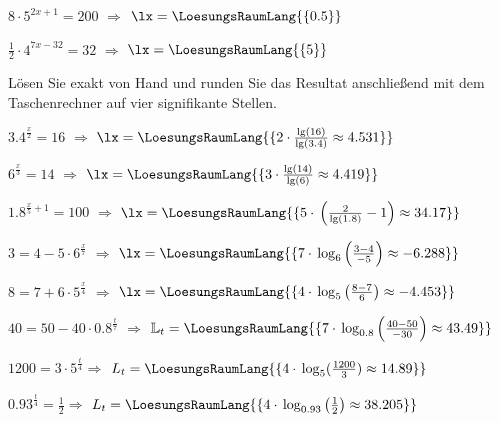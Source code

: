 \begin{bbwAufgabenBlock}
\item $8\cdot{} 5^{2x+1} = 200$  $\Longrightarrow$ $\lx=\LoesungsRaumLang{\{ 0.5 \}}$ 


\item $\frac12 \cdot{} 4^{7x-32} = 32$  $\Longrightarrow$ $\lx=\LoesungsRaumLang{\{ 5 \}}$ \noTRAINER{\seitenUmbruchImAufgabenteil{}}

Lösen Sie exakt von Hand und runden Sie das Resultat anschließend mit dem Taschenrechner auf vier signifikante Stellen.

\item $3.4^{\frac{x}2} = 16$  $\Longrightarrow$
$\lx=\LoesungsRaumLang{\{2\cdot{} \frac{\lg(16)}{\lg(3.4)} \approx 4.531 \}}$ 
\noTRAINER{\seitenUmbruchImAufgabenteil{}}
\item $6^{\frac{x}3} = 14$  $\Longrightarrow$
$\lx=\LoesungsRaumLang{\{3\cdot{} \frac{\lg(14)}{\lg(6)} \approx 4.419 \}}$ 

\item $1.8^{\frac{x}5+1} = 100$  $\Longrightarrow$
$\lx=\LoesungsRaumLang{\{5\cdot{}\left(\frac{2}{\lg(1.8)} - 1\right) \approx 34.17 \}}$ \noTRAINER{\seitenUmbruchImAufgabenteil{}}


\item $3 = 4 - 5\cdot{}6^\frac{x}7$  $\Longrightarrow$ $\lx=\LoesungsRaumLang{\{ 7\cdot{} \log_{6}\left(\frac{3-4}{-5}\right)  \approx  -6.288 \}}$ 

\item $8 = 7 + 6\cdot{}5^\frac{x}4$  $\Longrightarrow$ $\lx=\LoesungsRaumLang{\{ 4\cdot{} \log_{5}\left(\frac{8-7}{6}\right)  \approx -4.453 \}}$ \noTRAINER{\seitenUmbruchImAufgabenteil{}}

\item $40 = 50 - 40\cdot{}0.8^\frac{t}7$  $\Longrightarrow$ $\mathbb{L}_t=\LoesungsRaumLang{\{ 7\cdot{} \log_{0.8}\left(\frac{40-50}{-30}\right)  \approx 43.49 \}}$ 
\\




\item $1200=3\cdot{} 5^{\frac{t}{4}} \Longrightarrow$ $L_t = \LoesungsRaumLang{\{ 4\cdot{}\log_5(\frac{1200}3)\approx 14.89   \}}$ \noTRAINER{\seitenUmbruchImAufgabenteil{}}

\item $0.93^{\frac{t}4}=\frac12 \Longrightarrow$ $L_t
= \LoesungsRaumLang{\{
4\cdot{}\log_{0.93}\left(\frac12\right) \approx 38.205   \}}$ 


\end{bbwAufgabenBlock}
